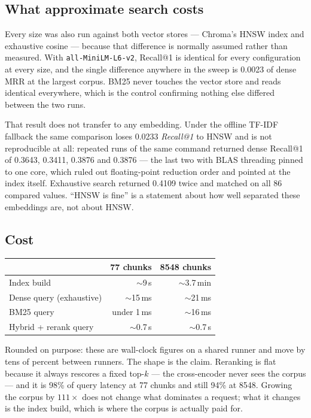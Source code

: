 \documentclass[11pt,a4paper]{article}
\newcommand{\code}[1]{\texttt{\small #1}}
\begin{document}
\subsection{What approximate search costs}

Every size was also run against both vector stores --- Chroma's HNSW index and
exhaustive cosine --- because that difference is normally assumed rather than
measured. With \code{all-MiniLM-L6-v2}, Recall@1 is identical for every
configuration at every size, and the single difference anywhere in the sweep is
0.0023 of dense MRR at the largest corpus. BM25 never touches the vector store
and reads identical everywhere, which is the control confirming nothing else
differed between the two runs.

That result does not transfer to any embedding. Under the offline TF-IDF
fallback the same comparison loses 0.0233 \emph{Recall@1} to HNSW and is not
reproducible at all: repeated runs of the same command returned dense Recall@1 of
0.3643, 0.3411, 0.3876 and 0.3876 --- the last two with BLAS threading pinned to
one core, which ruled out floating-point reduction order and pointed at the index
itself. Exhaustive search returned 0.4109 twice and matched on all 86 compared
values. ``HNSW is fine'' is a statement about how well separated these embeddings
are, not about HNSW.

\subsection{Cost}

\begin{center}
\small
\begin{tabular}{@{}lrr@{}}
\toprule
& \textbf{77 chunks} & \textbf{8548 chunks} \\
\midrule
Index build                & $\sim$9\,s        & $\sim$3.7\,min \\
Dense query (exhaustive)   & $\sim$15\,ms      & $\sim$21\,ms \\
BM25 query                 & under 1\,ms       & $\sim$16\,ms \\
Hybrid + rerank query      & $\sim$0.7\,s      & $\sim$0.7\,s \\
\bottomrule
\end{tabular}
\end{center}

Rounded on purpose: these are wall-clock figures on a shared runner and move by
tens of percent between runners. The shape is the claim. Reranking is flat
because it always rescores a fixed top-$k$ --- the cross-encoder never sees the
corpus --- and it is 98\% of query latency at 77 chunks and still 94\% at 8548.
Growing the corpus by $111\times$ does not change what dominates a request; what
it changes is the index build, which is where the corpus is actually paid for.
\end{document}
